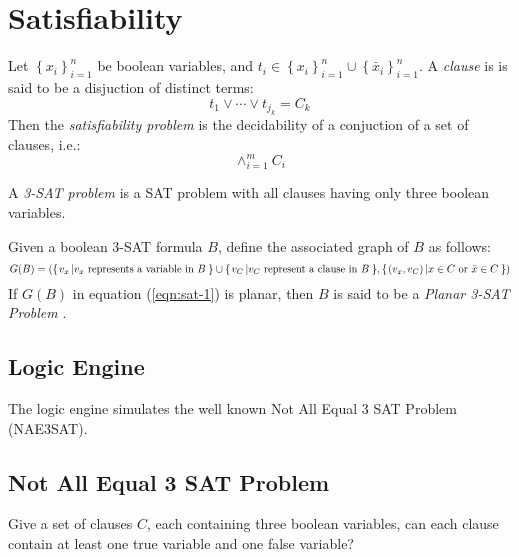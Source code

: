 \section{Satisfiability}
\begin{prob}\label{prob:Satisfiability-1}%
Let $\left\lbrace x_i \right\rbrace_{i=1}^{n} $ be boolean variables, and $t_i \in \left\lbrace 
x_i\right\rbrace_{i=1}^{n}  \cup \left\lbrace \bar{x}_i\right\rbrace_{i=1}^{n}   $.  A 
\textit{clause} is is said to be a disjuction of distinct terms:
$$
t_1 \vee \cdots \vee t_{j_k} = C_k
$$
Then the \textit{satisfiability problem} is the decidability of a conjuction of a set of clauses, 
i.e.:
$$ \wedge_{i=1}^m C_i$$
\end{prob} \cite{skiena2009algorithm}
A \textit{3-SAT problem} is a SAT problem with all clauses having only three boolean variables. 
\begin{definition}\label{def:Satisfiability-2}
Given a boolean 3-SAT formula $B$, define the associated graph of $B$ as follows:  
\begin{equation}\label{eqn:sat-1}
G(B) = \left({\left\lbrace \left. v_x \left\vert v_x\text{ represents a variable in }B \right.\right.\right\rbrace } \cup {\left\lbrace \left. v_C \left\vert v_C\text{ represent a 
clause in }B \right.\right.\right\rbrace }  , {\left\lbrace \left. \left( v_x, v_C\right)  \left\vert x \in C \text{ or } \bar{x} \in C \right.\right.\right\rbrace }  \right) 
\end{equation} 
If $G(B)$ in equation (\ref{eqn:sat-1}) is planar, then $B$ is said to be a \textit{Planar 3-SAT 
Problem} \cite{mulzer2008minimum}.
\end{definition}
\subsection{Logic Engine}
The logic engine simulates the well known Not All Equal 3 SAT Problem (NAE3SAT).  
\subsection{Not All Equal 3 SAT Problem}
\begin{prob}\label{prob:Satisfiability-2}%
Give a set of clauses $C$, each containing three boolean variables, can each clause contain at 
least one true variable and one false variable?
\end{prob}
